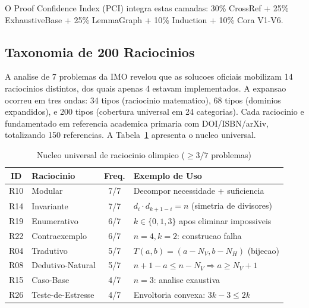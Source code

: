 \documentclass[5p]{elsarticle}
\begin{document}
O Proof Confidence Index (PCI) integra estas camadas: 30\% CrossRef + 25\%
ExhaustiveBase + 25\% LemmaGraph + 10\% Induction + 10\% Cora V1-V6.

\subsection{Taxonomia de 200 Raciocinios}

A analise de 7 problemas da IMO revelou que as solucoes oficiais mobilizam
14 raciocinios distintos, dos quais apenas 4 estavam implementados. A expansao
\cite{taxonomia200} ocorreu em tres ondas: 34 tipos (raciocinio matematico),
68 tipos (dominios expandidos), e 200 tipos (cobertura universal em 24 categorias).
Cada raciocinio e fundamentado em referencia academica primaria com DOI/ISBN/arXiv,
totalizando 150 referencias. A Tabela~\ref{tab:core} apresenta o nucleo universal.

\begin{table}[H]
  \centering
  \caption{Nucleo universal de raciocinio olimpico ($\geq 3/7$ problemas)}
  \label{tab:core}
  \small
  \begin{tabular}{clcp{5cm}}
    \toprule
    \textbf{ID} & \textbf{Raciocinio} & \textbf{Freq.} & \textbf{Exemplo de Uso} \\
    \midrule
    R10 & Modular & 7/7 & Decompor necessidade + suficiencia \\
    \rowcolor{greenbg} R14 & Invariante & 7/7 & $d_i\cdot d_{k+1-i}=n$ (simetria de divisores) \\
    R19 & Enumerativo & 6/7 & $k\in\{0,1,3\}$ apos eliminar impossiveis \\
    R22 & Contraexemplo & 6/7 & $n=4,k=2$: construcao falha \\
    \rowcolor{greenbg} R04 & Tradutivo & 5/7 & $T(a,b)=(a-N_V,b-N_H)$ (bijecao) \\
    R08 & Dedutivo-Natural & 5/7 & $n+1-a\leq n-N_V \Rightarrow a\geq N_V+1$ \\
    R15 & Caso-Base & 4/7 & $n=3$: analise exaustiva \\
    R26 & Teste-de-Estresse & 4/7 & Envoltoria convexa: $3k-3\leq 2k$ \\
    \bottomrule
  \end{tabular}
\end{table}

\end{document}
